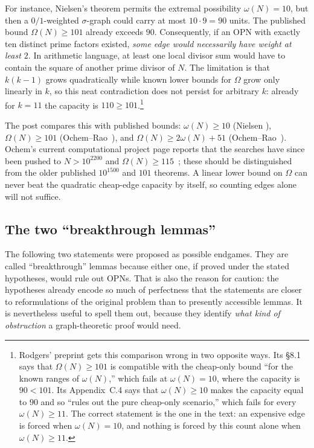 \documentclass[11pt]{article}
\theoremstyle{definition}
\theoremstyle{remark}
\begin{document}
For instance, Nielsen's theorem permits the extremal possibility
$\omega(N)=10$, but then a $0/1$-weighted $\sigma$-graph could carry at most
$10\cdot9=90$ units.  The published bound $\Omega(N)\ge101$ already exceeds
$90$.  Consequently, if an OPN with exactly ten distinct prime factors
existed, \emph{some edge would necessarily have weight at least $2$}.  In
arithmetic language, at least one local divisor sum would have to contain the
square of another prime divisor of $N$.  The limitation is that
$k(k-1)$ grows quadratically while known lower bounds for $\Omega$ grow only
linearly in $k$, so this neat contradiction does not persist for arbitrary
$k$: already for $k=11$ the capacity is $110\ge101$.\footnote{Rodgers'
preprint gets this comparison wrong in two opposite ways.  Its \S8.1 says
that $\Omega(N)\ge101$ is compatible with the cheap-only bound ``for the
known ranges of $\omega(N)$,'' which fails at $\omega(N)=10$, where the
capacity is $90<101$.  Its Appendix~C.4 says that $\omega(N)\ge10$ makes the
capacity equal to $90$ and so ``rules out the pure cheap-only scenario,''
which fails for every $\omega(N)\ge11$.  The correct statement is the one in
the text: an expensive edge is forced when $\omega(N)=10$, and nothing is
forced by this count alone when $\omega(N)\ge11$.}

The post compares this with published bounds: $\omega(N)\ge10$ (Nielsen
\cite{Nielsen}), $\Omega(N)\ge101$ (Ochem--Rao~\cite{OR2012}), and
$\Omega(N)\ge2\omega(N)+51$ (Ochem--Rao~\cite{OR2014}).  Ochem's current
computational project page reports that the searches have since been pushed
to $N>10^{2200}$ and $\Omega(N)\ge115$~\cite{OchemWeb}; these should be
distinguished from the older published $10^{1500}$ and $101$ theorems.
A linear lower bound on $\Omega$ can never beat the quadratic cheap-edge
capacity by itself, so counting edges alone will not suffice.

\subsection{The two ``breakthrough lemmas''}

The following two statements were proposed as possible endgames.  They are
called ``breakthrough'' lemmas because either one, if proved under the stated
hypotheses, would rule out OPNs.  That is also the reason for caution: the
hypotheses already encode so much of perfectness that the statements are
closer to reformulations of the original problem than to presently accessible
lemmas.  It is nevertheless useful to spell them out, because they identify
\emph{what kind of obstruction} a graph-theoretic proof would need.
\end{document}

